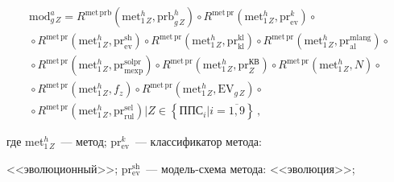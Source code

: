  \begin{multline}


 \mathrm{mod}^a_{g\,Z}=R^{\mathrm{met}\,\mathrm{prb}}\left( \mathrm{met}_{1\,Z}^h,\mathrm{prb}^h_{g\,Z}\right) \circ


R^{\mathrm{met\,pr}}\left( \mathrm{met}^h_{1\,Z}, \mathrm{pr}^k_{\mathrm{ev}}\right) \circ{}\\


{}\circ R^{\mathrm{met\,pr}}\left(


\mathrm{met}^h_{1\,Z},\mathrm{pr}^{\mathrm{sh}}_{\mathrm{ev}}\right)


 \circ R^{\mathrm{met\,pr}}\left( \mathrm{met}^h_{1\,Z},\mathrm{pr}_{\mathrm{kl}}^{\mathrm{kl}}\right)\circ


 R^{\mathrm{met\,pr}}\left(


\mathrm{met}^h_{1\,Z},\mathrm{pr}_{\mathrm{al}}^{\mathrm{mlang}}\right) \circ {}\\


{}\circ R^{\mathrm{met\,pr}}\left(


\mathrm{met}^h_{1\,Z},\mathrm{pr}_{\mathrm{mexp}}^{\mathrm{solpr}}\right)


\circ R^{\mathrm{met\,pr}}\left( \mathrm{met}^h_{1\,Z},\mathrm{pr}_Z^{\mathrm{КВ}}\right)


\circ R^{\mathrm{met\,pr}}\left(


\mathrm{met}^h_{1\,Z},N\right) \circ {}\\


{}\circ R^{\mathrm{met\,pr}}\left( \mathrm{met}_{1\,Z}^h, f_z\right)


\circ R^{\mathrm{met\,pr}}\left( \mathrm{met}^h_{1\,Z},\mathrm{EV}_{g\,Z}\right)\circ{}\\


{}\circ


R^{\mathrm{met\,pr}}\left(


\mathrm{met}^h_{1\,Z},\mathrm{pr}_{\mathrm{rul}}^{\mathrm{sel}}\right) \big\vert


Z\in \left\{ \mathrm{ППС}_i\vert


i=\overline{1,9}\right\}\,,


 \label{e4-kir}


 \end{multline}


 где met$^h_{1\,Z}$~--- метод; pr$^k_{\mathrm{ev}}$~--- классификатор метода:


<<эволюционный>>; pr$_{\mathrm{ev}}^{\mathrm{sh}}$~--- мо\-дель-схе\-ма метода: <<эволюция>>;


